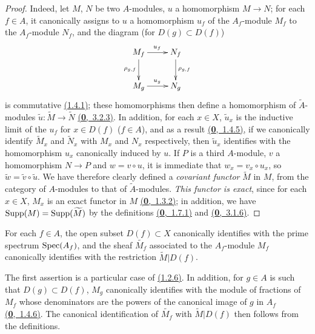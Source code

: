 \begin{proof}
\label{proof-prop-1.1.3.5}
Indeed, let $M$, $N$ be two $A$-modules, $u$ a homomorphism $M\to N$; for each $f\in A$,
it canonically assigns to $u$ a homomorphism $u_f$ of the $A_f$-module $M_f$ to the
$A_f$-module $N_f$, and the diagram (for $D(g)\subset D(f)$)
\[
  \xymatrix{
    M_f\ar[r]^{u_f}\ar[d]_{\rho_{g,f}} & N_f\ar[d]^{\rho_{g,f}}\\
    M_g\ar[r]^{u_g} & N_g
  }
\]
is commutative \hyperref[thm-1.1.4.1]{(1.4.1)}; these homomorphisms then define a homomorphism of
$\widetilde{A}$-modules $\widetilde{u}:\widetilde{M}\to\widetilde{N}$ \hyperref[env-0.3.2.3]{(\textbf{0},~3.2.3)}. In
addition, for each $x\in X$, $\widetilde{u}_x$ is the inductive limit of the $u_f$ for
$x\in D(f)$ ($f\in A$), and as a result \hyperref[env-0.1.4.5]{(\textbf{0},~1.4.5)}, if we canonically identify
$\widetilde{M}_x$ and $\widetilde{N}_x$ with $M_x$ and $N_x$ respectively, then $\widetilde{u}_x$
identifies with the homomorphism $u_x$ canonically induced by $u$. If $P$ is a third
$A$-module, $v$ a homomorphism $N\to P$ and $w=v\circ u$, it is immediate that
$w_x=v_x\circ u_x$, so $\widetilde{w}=\widetilde{v}\circ\widetilde{u}$. We have therefore
clearly defined a {\it covariant functor} $\widetilde{M}$ in $M$, from the category of
$A$-modules to that of $\widetilde{A}$-modules. {\it This functor is exact}, since for each
$x\in X$, $M_x$ is an exact functor in $M$ \hyperref[env-0.1.3.2]{(\textbf{0},~1.3.2)}; in addition, we have
${\mathop{\mathrm{Supp}}\nolimits}(M)={\mathop{\mathrm{Supp}}\nolimits}(\widetilde{M})$ by the definitions \hyperref[env-0.1.7.1]{(\textbf{0},~1.7.1)} and
\hyperref[env-0.3.1.6]{(\textbf{0},~3.1.6)}.
\end{proof}

\begin{prop}[1.3.6]
\label{prop-1.1.3.6}
For each $f\in A$, the open subset $D(f)\subset X$ canonically identifies with the prime
spectrum ${\mathop{\mathrm{Spec}}\nolimits}(A_f)$, and the sheaf $\widetilde{M_f}$ associated to the $A_f$-module
$M_f$ canonically identifies with the restriction $\widetilde{M}|D(f)$.
\end{prop}

The first assertion is a particular case of \hyperref[cor-1.1.2.6]{(1.2.6)}. In addition, for $g\in A$ is
such that $D(g)\subset D(f)$, $M_g$ canonically identifies with the module of fractions of
$M_f$ whose denominators are the powers of the canonical image of $g$ in $A_f$
\hyperref[env-0.1.4.6]{(\textbf{0},~1.4.6)}. The canonical identification of $\widetilde{M_f}$ with
$\widetilde{M}|D(f)$ then follows from the definitions.

